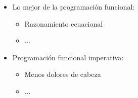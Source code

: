 \documentclass[spanish]{beamer}
\begin{document}
\begin{frame}
  \begin{itemize}
  \item
    Lo mejor de la programación funcional:
    \begin{itemize}
    \item
      Razonamiento ecuacional
    \item
      ...
    \end{itemize}
  \item
    Programación funcional imperativa:
    \begin{itemize}
    \item
      Menos dolores de cabeza
    \item
      ...
    \end{itemize}
  \end{itemize}
\end{frame}



\end{document}
